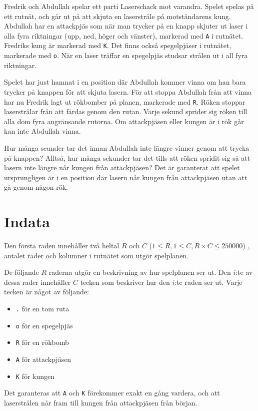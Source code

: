 Fredrik och Abdullah spelar ett parti Laserschack mot varandra. Spelet spelas på ett rutnät,
och går ut på att skjuta en laserstråle på motståndarens kung.
Abdullah har en attackpjäs som när man trycker på en knapp skjuter ut laser i alla fyra riktningar (upp, ned, höger och vänster), markerad med \texttt{A} i rutnätet.
Fredriks kung är markerad med \texttt{K}. Det finns också spegelpjäser i rutnätet, markerade med \texttt{o}.
När en laser träffar en spegelpjäs studsar strålen ut i all fyra riktningar.

Spelet har just hamnat i en position där Abdullah kommer vinna om han bara trycker på knappen för att skjuta lasern.
För att stoppa Abdullah från att vinna har nu Fredrik lagt ut rökbomber på planen, markerade med \texttt{R}.
Röken stoppar laserstrålar från att färdas genom den rutan. Varje sekund sprider sig röken till alla dom fyra angränsande rutorna.
Om attackpjäsen eller kungen är i rök går kan inte Abdullah vinna. 

Hur många seunder tar det innan Abdullah inte längre vinner genom att trycka på knappen?
Alltså, hur många sekunder tar det tills att röken spridit sig så att lasern inte längre når kungen från attackpjäsen?
Det är garanterat att spelet ursprungligen är i en position där lasern når kungen från attackpjäsen utan att gå genom någon rök.

\section*{Indata}
Den första raden innehåller två heltal $R$ och $C$ ($1\le R, 1 \le C, R\times C \le 250 000$) , antalet rader och kolumner i rutnätet som utgör spelplanen.

De följande $R$ raderna utgör en beskrivning av hur spelplanen ser ut.
Den $i$:te av dessa rader innehåller $C$ tecken som beskriver hur den $i$:te raden ser ut.
Varje tecken är något av följande:
\begin{itemize}
    \item \texttt{.} för en tom ruta
    \item \texttt{o} för en spegelpjäs
    \item \texttt{R} för en rökbomb
    \item \texttt{A} för attackpjäsen
    \item \texttt{K} för kungen
\end{itemize}
Det garanteras att \texttt{A} och \texttt{K} förekommer exakt en gång vardera, och att laserstrålen når fram till kungen från attackpjäsen från början.

